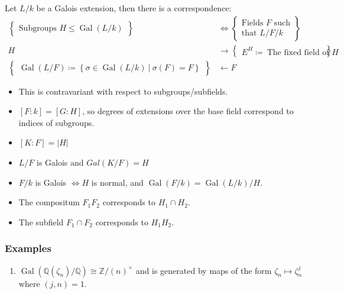\begin{theorem}

Let \(L/k\) be a Galois extension, then there is a correspondence:
\begin{align*}
\left\{{\substack{\text{Subgroups } H \leq \operatorname{Gal}(L/k)}}\right\}
&\iff
\left\{{\substack{\text{Fields }  F \text{ such}\\ \text{that } L/F/k}}\right\} \\
H &\rightarrow \left\{{\substack{E^H \coloneqq~\text{The fixed field of $H$}}}\right\} \\
\left\{{\substack{\operatorname{Gal}(L/F) \coloneqq\left\{{ \sigma \in \operatorname{Gal}(L/k) {~\mathrel{\Big|}~}\sigma(F) = F}\right\}}}\right\} &\leftarrow F
\end{align*}

\begin{itemize}
\item
  This is contravariant with respect to subgroups/subfields.
\item
  \([F: k] = [G: H]\), so degrees of extensions over the base field
  correspond to indices of subgroups.
\item
  \([K : F] = {\left\lvert {H} \right\rvert}\)
\item
  \(L/F\) is Galois and \(Gal(K/F) = H\)
\item
  \(F/k\) is Galois \(\iff H\) is normal, and
  \(\operatorname{Gal}(F/k) = \operatorname{Gal}(L/k)/H\).
\item
  The compositum \(F_1 F_2\) corresponds to \(H_1 \cap H_2\).
\item
  The subfield \(F_1 \cap F_2\) corresponds to \(H_1 H_2\).
\end{itemize}

\end{theorem}

\hypertarget{examples}{%
\subsubsection{Examples}\label{examples}}

\begin{enumerate}
\def\labelenumi{\arabic{enumi}.}
\tightlist
\item
  \(\operatorname{Gal}({\mathbb{Q}}(\zeta_n)/{\mathbb{Q}}) \cong {\mathbb{Z}}/(n)^{\times}\)
  and is generated by maps of the form \(\zeta_n \mapsto \zeta_n^j\)
  where \((j, n) = 1\).
\end{enumerate}

